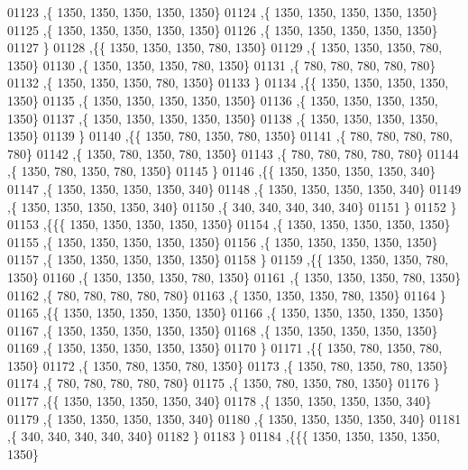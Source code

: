 \begin{DoxyCode}
01123    ,\{  1350,  1350,  1350,  1350,  1350\}
01124    ,\{  1350,  1350,  1350,  1350,  1350\}
01125    ,\{  1350,  1350,  1350,  1350,  1350\}
01126    ,\{  1350,  1350,  1350,  1350,  1350\}
01127    \}
01128   ,\{\{  1350,  1350,  1350,   780,  1350\}
01129    ,\{  1350,  1350,  1350,   780,  1350\}
01130    ,\{  1350,  1350,  1350,   780,  1350\}
01131    ,\{   780,   780,   780,   780,   780\}
01132    ,\{  1350,  1350,  1350,   780,  1350\}
01133    \}
01134   ,\{\{  1350,  1350,  1350,  1350,  1350\}
01135    ,\{  1350,  1350,  1350,  1350,  1350\}
01136    ,\{  1350,  1350,  1350,  1350,  1350\}
01137    ,\{  1350,  1350,  1350,  1350,  1350\}
01138    ,\{  1350,  1350,  1350,  1350,  1350\}
01139    \}
01140   ,\{\{  1350,   780,  1350,   780,  1350\}
01141    ,\{   780,   780,   780,   780,   780\}
01142    ,\{  1350,   780,  1350,   780,  1350\}
01143    ,\{   780,   780,   780,   780,   780\}
01144    ,\{  1350,   780,  1350,   780,  1350\}
01145    \}
01146   ,\{\{  1350,  1350,  1350,  1350,   340\}
01147    ,\{  1350,  1350,  1350,  1350,   340\}
01148    ,\{  1350,  1350,  1350,  1350,   340\}
01149    ,\{  1350,  1350,  1350,  1350,   340\}
01150    ,\{   340,   340,   340,   340,   340\}
01151    \}
01152   \}
01153  ,\{\{\{  1350,  1350,  1350,  1350,  1350\}
01154    ,\{  1350,  1350,  1350,  1350,  1350\}
01155    ,\{  1350,  1350,  1350,  1350,  1350\}
01156    ,\{  1350,  1350,  1350,  1350,  1350\}
01157    ,\{  1350,  1350,  1350,  1350,  1350\}
01158    \}
01159   ,\{\{  1350,  1350,  1350,   780,  1350\}
01160    ,\{  1350,  1350,  1350,   780,  1350\}
01161    ,\{  1350,  1350,  1350,   780,  1350\}
01162    ,\{   780,   780,   780,   780,   780\}
01163    ,\{  1350,  1350,  1350,   780,  1350\}
01164    \}
01165   ,\{\{  1350,  1350,  1350,  1350,  1350\}
01166    ,\{  1350,  1350,  1350,  1350,  1350\}
01167    ,\{  1350,  1350,  1350,  1350,  1350\}
01168    ,\{  1350,  1350,  1350,  1350,  1350\}
01169    ,\{  1350,  1350,  1350,  1350,  1350\}
01170    \}
01171   ,\{\{  1350,   780,  1350,   780,  1350\}
01172    ,\{  1350,   780,  1350,   780,  1350\}
01173    ,\{  1350,   780,  1350,   780,  1350\}
01174    ,\{   780,   780,   780,   780,   780\}
01175    ,\{  1350,   780,  1350,   780,  1350\}
01176    \}
01177   ,\{\{  1350,  1350,  1350,  1350,   340\}
01178    ,\{  1350,  1350,  1350,  1350,   340\}
01179    ,\{  1350,  1350,  1350,  1350,   340\}
01180    ,\{  1350,  1350,  1350,  1350,   340\}
01181    ,\{   340,   340,   340,   340,   340\}
01182    \}
01183   \}
01184  ,\{\{\{  1350,  1350,  1350,  1350,  1350\}

\end{DoxyCode}
